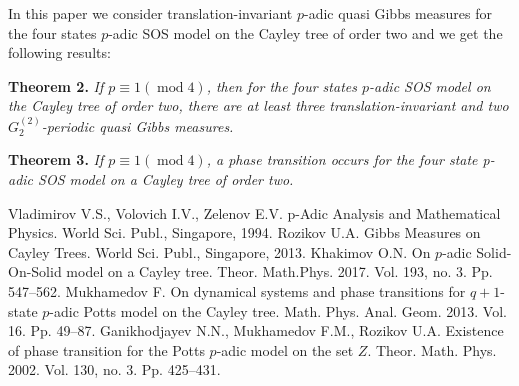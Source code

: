 \documentclass[12pt]{llncs}
\begin{document}
In this paper we consider translation-invariant $p$-adic quasi Gibbs measures for the four states $p$-adic SOS model on the Cayley tree of order two and we get the following results:

\textbf{Theorem 2.} \label{TR_2}
\emph{If $p\equiv 1 (\operatorname{mod }4)$, then for the four states $p$-adic  SOS model on the Cayley tree of order two,
there are at least three translation-invariant and two $G^{(2)}_2$-periodic quasi Gibbs measures.}

\textbf{Theorem 3.} \label{phase tra_2}
\emph{If $p\equiv 1 (\operatorname{mod }4)$, a phase transition occurs for the four state p-adic SOS model on a Cayley tree of order two.}

\begin{thebibliography}{9} %
  Vladimirov V.S.,  Volovich I.V.,    Zelenov E.V.  {p-Adic Analysis and Mathematical Physics}. World Sci. Publ., Singapore, 1994.
   Rozikov U.A.  {Gibbs Measures on Cayley Trees}. World Sci. Publ., Singapore, 2013.
   Khakimov O.N.  { On $p$-adic Solid-On-Solid model on a Cayley tree}. Theor. Math.Phys. 2017. Vol. 193, no. 3. Pp. 547--562.
 Mukhamedov F.   {On dynamical systems and phase
transitions for $q+1$-state $p$-adic Potts model on the Cayley tree}.
Math. Phys. Anal. Geom. 2013. Vol. 16. Pp. 49--87.
  Ganikhodjayev N.N.,  Mukhamedov F.M.,  Rozikov U.A.  {Existence
of phase transition for the Potts $p$-adic model on the set $Z$.}
 Theor. Math. Phys. 2002. Vol. 130, no. 3. Pp. 425--431.

\end{thebibliography}

\end{document}
